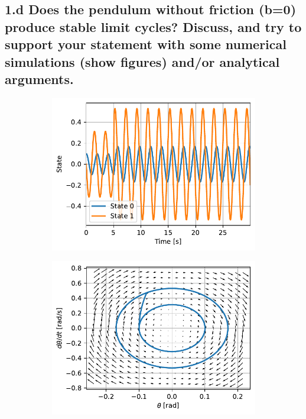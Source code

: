 \documentclass{cmc}
\begin{document}
\subsection*{1.d Does the pendulum without friction (b=0) produce stable limit
  cycles? Discuss, and try to support your statement with some numerical
  simulations (show figures) and/or analytical arguments.}


\begin{figure}[H]
  \centering
  \begin{subfigure}[b]{0.49\textwidth}
    { \centering
      \includegraphics[width=\textwidth]{figures/State_with_perturbation_(x0=[0dot1,_0])}
      \label{fig:pendulum-no-friction-stable-limit-state}
    }
    \caption{}
  \end{subfigure}
  \begin{subfigure}[b]{0.49\textwidth}
    { \centering
      \includegraphics[width=\textwidth]{figures/Phase_with_perturbation_(x0=[0dot1,_0])}
      \label{fig:pendulum-no-friction-stable-limit-phase}
    }
    \caption{}
  \end{subfigure}
  \caption{}
  \label{fig:pendulum-no-friction-stable-limit}
\end{figure}
\end{document}
